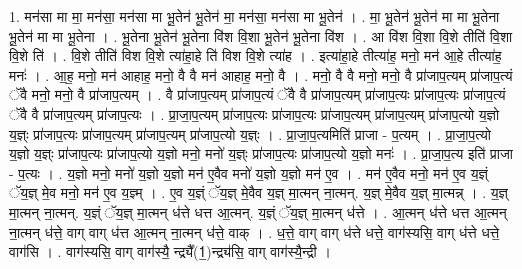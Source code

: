 \documentclass[17pt]{extarticle}
\begin{document}
1. मन॑सा मा मा॒ मन॑सा॒ मन॑सा मा भू॒तेन॑ भू॒तेन॑ मा॒ मन॑सा॒ मन॑सा मा भू॒तेन॑ । . मा॒ भू॒तेन॑ भू॒तेन॑ मा मा भू॒तेना भू॒तेन॑ मा मा भू॒तेना । . भू॒तेना भू॒तेन॑ भू॒तेना वि॑श वि॒शा भू॒तेन॑ भू॒तेना वि॑श । . आ वि॑श वि॒शा वि॒शे तीति॑ वि॒शा वि॒शे ति॑ । . वि॒शे तीति॑ विश वि॒शे त्या॑हा॒हे ति॑ विश वि॒शे त्या॑ह । . इत्या॑हा॒हे तीत्या॑ह॒ मनो॒ मन॑ आ॒हे तीत्या॑ह॒ मनः॑ । . आ॒ह॒ मनो॒ मन॑ आहाह॒ मनो॒ वै वै मन॑ आहाह॒ मनो॒ वै । . मनो॒ वै वै मनो॒ मनो॒ वै प्रा॑जाप॒त्यम् प्रा॑जाप॒त्यं ॅवै मनो॒ मनो॒ वै प्रा॑जाप॒त्यम् । . वै प्रा॑जाप॒त्यम् प्रा॑जाप॒त्यं ॅवै वै प्रा॑जाप॒त्यम् प्रा॑जाप॒त्यः प्रा॑जाप॒त्यः प्रा॑जाप॒त्यं ॅवै वै प्रा॑जाप॒त्यम् प्रा॑जाप॒त्यः । . प्रा॒जा॒प॒त्यम् प्रा॑जाप॒त्यः प्रा॑जाप॒त्यः प्रा॑जाप॒त्यम् प्रा॑जाप॒त्यम् प्रा॑जाप॒त्यो य॒ज्ञो य॒ज्ञ्ः प्रा॑जाप॒त्यः प्रा॑जाप॒त्यम् प्रा॑जाप॒त्यम् प्रा॑जाप॒त्यो य॒ज्ञ्ः । . प्रा॒जा॒प॒त्यमिति॑ प्राजा - प॒त्यम् । . प्रा॒जा॒प॒त्यो य॒ज्ञो य॒ज्ञ्ः प्रा॑जाप॒त्यः प्रा॑जाप॒त्यो य॒ज्ञो मनो॒ मनो॑ य॒ज्ञ्ः प्रा॑जाप॒त्यः प्रा॑जाप॒त्यो य॒ज्ञो मनः॑ । . प्रा॒जा॒प॒त्य इति॑ प्राजा - प॒त्यः । . य॒ज्ञो मनो॒ मनो॑ य॒ज्ञो य॒ज्ञो मन॑ ए॒वैव मनो॑ य॒ज्ञो य॒ज्ञो मन॑ ए॒व । . मन॑ ए॒वैव मनो॒ मन॑ ए॒व य॒ज्ञ्ं ॅय॒ज्ञ् मे॒व मनो॒ मन॑ ए॒व य॒ज्ञ्म् । . ए॒व य॒ज्ञ्ं ॅय॒ज्ञ् मे॒वैव य॒ज्ञ् मा॒त्मन् ना॒त्मन्. य॒ज्ञ् मे॒वैव य॒ज्ञ् मा॒त्मन्न् । . य॒ज्ञ् मा॒त्मन् ना॒त्मन्. य॒ज्ञ्ं ॅय॒ज्ञ् मा॒त्मन् ध॑त्ते धत्त आ॒त्मन्. य॒ज्ञ्ं ॅय॒ज्ञ् मा॒त्मन् ध॑त्ते । . आ॒त्मन् ध॑त्ते धत्त आ॒त्मन् ना॒त्मन् ध॑त्ते॒ वाग् वाग् ध॑त्त आ॒त्मन् ना॒त्मन् ध॑त्ते॒ वाक् । . ध॒त्ते॒ वाग् वाग् ध॑त्ते धत्ते॒ वाग॑स्यसि॒ वाग् ध॑त्ते धत्ते॒ वाग॑सि । . वाग॑स्यसि॒ वाग् वाग॑स्यै॒ न्द्र्यै᳚(1॒)न्द्र्य॑सि॒ वाग् वाग॑स्यै॒न्द्री । \newline
\end{document}
